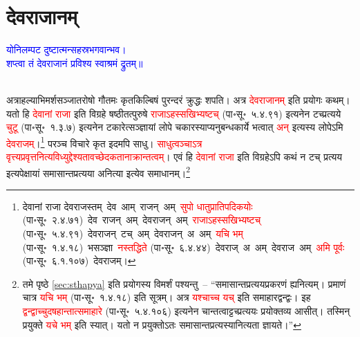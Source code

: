 \section[देवराजानम्]{देवराजानम्‌}
\label{sec:devarajanam}
\centering\textcolor{blue}{योनिलम्पट दुष्टात्मन्सहस्रभगवान्भव।\nopagebreak\\
शप्त्वा तं देवराजानं प्रविश्य स्वाश्रमं द्रुतम्॥}\nopagebreak\\
\\
\begin{sloppypar}\justifying\noindent\hspace{10mm} अत्राहल्याभिमर्श\-सञ्जात\-रोषो गौतमः कृत\-किल्बिषं पुरन्दरं क्रुद्धः शपति। अत्र \textcolor{red}{देवराजानम्‌} इति प्रयोगः कथम्। यतो हि \textcolor{red}{देवानां राजा} इति विग्रहे षष्ठी\-तत्पुरुषे \textcolor{red}{राजाऽहस्सखिभ्यष्टच्‌} (पा॰सू॰~५.४.९१) इत्यनेन टच्प्रत्यये \textcolor{red}{चुटू} (पा॰सू॰~१.३.७) इत्यनेन टकारेत्सञ्ज्ञायां लोपे चकारस्याप्यनुबन्ध\-कार्ये भत्वात् \textcolor{red}{अन्‌} इत्यस्य लोपेऽमि \textcolor{red}{देवराजम्‌}।\footnote{देवानां राजा देवराजस्तम्~\arrow देव~आम्~राजन्~अम्~\arrow \textcolor{red}{सुपो धातुप्रातिपदिकयोः} (पा॰सू॰~२.४.७१)~\arrow देव~राजन्~अम्~\arrow देवराजन्~अम्~\arrow \textcolor{red}{राजाऽहस्सखिभ्यष्टच्‌} (पा॰सू॰~५.४.९१)~\arrow देवराजन्~टच्~अम्~\arrow देवराजन्~अ~अम्~\arrow \textcolor{red}{यचि भम्‌} (पा॰सू॰~१.४.१८)~\arrow भसञ्ज्ञा~\arrow \textcolor{red}{नस्तद्धिते} (पा॰सू॰~६.४.४४)~\arrow देवराज्~अ~अम्~\arrow देवराज~अम्~\arrow \textcolor{red}{अमि पूर्वः} (पा॰सू॰~६.१.१०७)~\arrow देवराजम्।} परञ्च विचारे कृत इदमपि साधु। \textcolor{red}{साधुत्वञ्चाऽत्र वृत्त्यप्रवृत्त\-नित्य\-विध्युद्देश्यतावच्छेदकतानाक्रान्तत्वम्‌}। एवं हि \textcolor{red}{देवानां राजा} इति विग्रहेऽपि कथं न टच् प्रत्यय इत्यपेक्षायां समासान्त\-प्रत्यया अनित्या इत्येव समाधानम्।\footnote{\pageref{sec:sthapya}तमे पृष्ठे \ref{sec:sthapya}  इति प्रयोगस्य विमर्शं पश्यन्तु~– “समासान्त\-प्रत्यय\-प्रकरणं ह्यनित्यम्। प्रमाणं चात्र \textcolor{red}{यचि भम्‌} (पा॰सू॰~१.४.१८) इति सूत्रम्। अत्र \textcolor{red}{यश्चाच्च यच्‌} इति समाहार\-द्वन्द्वः। इह \textcolor{red}{द्वन्द्वाच्चु\-दषहान्तात्समाहारे} (पा॰सू॰~५.४.१०६) इत्यनेन चान्तत्वाट्टच्प्रत्ययः प्रयोक्तव्य आसीत्। तस्मिन् प्रयुक्ते \textcolor{red}{यचे भम्‌} इति स्यात्। यतो न प्रयुक्तोऽतः समासान्त\-प्रत्यस्यानित्यता ज्ञायते।”} \end{sloppypar}
